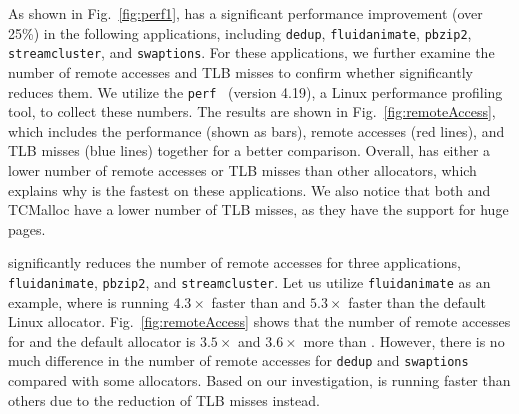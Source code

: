 As shown in Fig.~\ref{fig:perf1}, \NM{} has a significant performance improvement (over 25\%) in the following applications, including \texttt{dedup}, \texttt{fluidanimate}, \texttt{pbzip2}, \texttt{streamcluster}, and \texttt{swaptions}. For these applications, we further examine the number of remote accesses and TLB misses to confirm whether \NM{} significantly reduces them. 
We utilize the \texttt{perf}~\cite{perfweb} (version 4.19), a Linux performance profiling tool, to collect these numbers. 
The results are shown in Fig.~\ref{fig:remoteAccess}, which includes the performance (shown as bars), remote accesses (red lines), and TLB misses (blue lines) together for a better comparison. 
Overall, \NM{} has either a lower number of remote accesses or TLB misses than other allocators, which explains why \NM{} is the fastest on these applications. We also notice that both \NM{} and TCMalloc have a lower number of TLB misses, as they have the support for huge pages.   

\NM{} significantly reduces the number of remote accesses for three applications, \texttt{fluidanimate}, \texttt{pbzip2}, and \texttt{streamcluster}. Let us utilize \texttt{fluidanimate} as an example, where \NM{} is running $4.3\times$ faster than \TN{} and $5.3\times$ faster than the default Linux allocator. Fig.~\ref{fig:remoteAccess} shows that the number of remote accesses for \TN{} and the default allocator is $3.5\times$ and $3.6\times$ more than \NM{}. However, there is no much difference in the number of remote accesses for \texttt{dedup} and \texttt{swaptions} compared with some allocators. Based on our investigation, \NM{} is running faster than others due to the reduction of TLB misses instead. 

